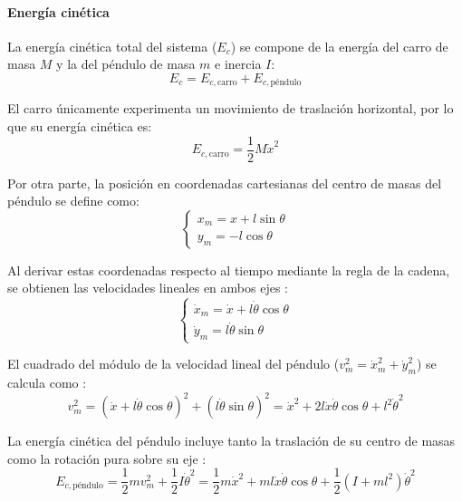 \documentclass[11pt,fleqn]{book} %
\begin{document}
\paragraph{Energía cinética}
La energía cinética total del sistema ($E_c$) se compone de la energía del carro de masa $M$ y la del péndulo de masa $m$ e inercia $I$:
\begin{equation}
	E_c = E_{c,\text{carro}} + E_{c,\text{péndulo}}
\end{equation}

El carro únicamente experimenta un movimiento de traslación horizontal, por lo que su energía cinética es:
\begin{equation}
	E_{c,\text{carro}} = \frac{1}{2}M\dot{x}^2
\end{equation}

Por otra parte, la posición en coordenadas cartesianas del centro de masas del péndulo se define como:
\begin{equation}
	\begin{cases}
		x_m = x + l\sin\theta \\
		y_m = -l\cos\theta
	\end{cases}
\end{equation}

Al derivar estas coordenadas respecto al tiempo mediante la regla de la cadena, se obtienen las velocidades lineales en ambos ejes \cite{franco_lagrange}:
\begin{equation}
	\begin{cases}
		\dot{x}_m = \dot{x} + l\dot{\theta}\cos\theta \\
		\dot{y}_m = l\dot{\theta}\sin\theta
	\end{cases}
\end{equation}

El cuadrado del módulo de la velocidad lineal del péndulo ($v_m^2 = \dot{x}_m^2 + \dot{y}_m^2$) se calcula como \cite{franco_lagrange}:
\begin{equation}
	v_m^2 = (\dot{x} + l\dot{\theta}\cos\theta)^2 + (l\dot{\theta}\sin\theta)^2 = \dot{x}^2 + 2l\dot{x}\dot{\theta}\cos\theta + l^2\dot{\theta}^2
\end{equation}

La energía cinética del péndulo incluye tanto la traslación de su centro de masas como la rotación pura sobre su eje \cite{franco_lagrange}:
\begin{equation}
	E_{c,\text{péndulo}} = \frac{1}{2}m v_m^2 + \frac{1}{2}I\dot{\theta}^2 = \frac{1}{2}m\dot{x}^2 + ml\dot{x}\dot{\theta}\cos\theta + \frac{1}{2}(I + ml^2)\dot{\theta}^2
\end{equation}
\end{document}
